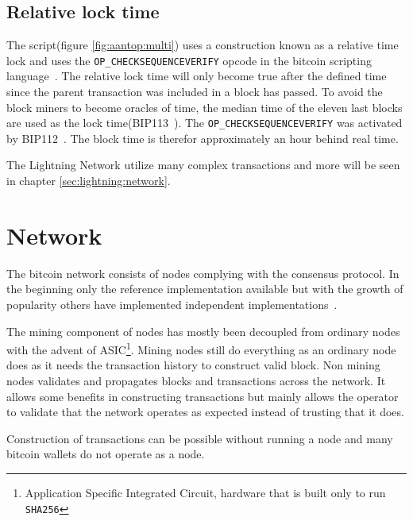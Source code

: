 \subsection{Relative lock time}
\label{sec:rlt}

The script(figure \ref{fig:aantop:multi}) uses a construction known as a relative time lock and uses the \texttt{OP\_CHECKSEQUENCEVERIFY} opcode in the bitcoin scripting language~\cite{bip:0068:sequence:lock:time}. The relative lock time will only become true after the defined time since the parent transaction was included in a block has passed. To avoid the block \gls{miner}s to become oracles of time, the median time of the eleven last blocks are used as the lock time(BIP113~\cite{bip:0113:median:time:passed}). The \texttt{OP\_CHECKSEQUENCEVERIFY} was activated by BIP112~\cite{bip:0112:sequence:lock:time:soft:fork}. The block time is therefor approximately an hour behind real time.

The Lightning Network utilize many complex transactions and more will be seen in chapter \ref{sec:lightning:network}.

\section{Network}

The \gls{bitcoin} network consists of nodes complying with the consensus protocol. In the beginning only the reference implementation available but with the growth of popularity others have implemented independent implementations~\cite{repository:bitcoin, repository:btcd, repository:neutrino}.

The mining component of nodes has mostly been decoupled from ordinary nodes with the advent of ASIC\footnote{Application Specific Integrated Circuit, hardware that is built only to run \texttt{SHA256}}. Mining nodes still do everything as an ordinary node does as it needs the transaction history to construct valid block. Non mining nodes validates and propagates blocks and transactions across the network. It allows some benefits in constructing transactions but mainly allows the operator to validate that the network operates as expected instead of trusting that it does.

Construction of transactions can be possible without running a node and many bitcoin wallets do not operate as a node.
